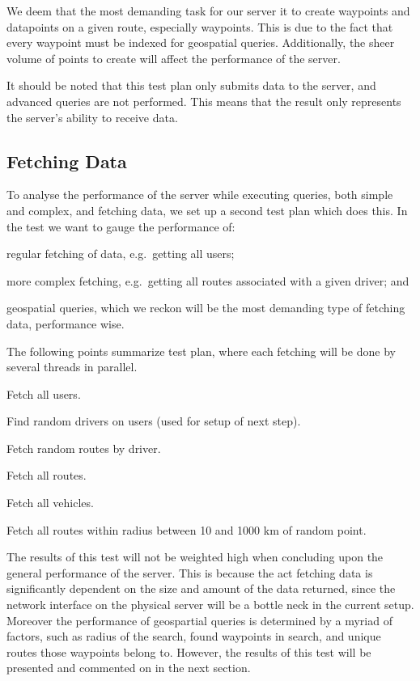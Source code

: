 We deem that the most demanding task for our server it to create waypoints and datapoints on a given route, especially waypoints.
This is due to the fact that every waypoint must be indexed for geospatial queries.
Additionally, the sheer volume of points to create will affect the performance of the server.

It should be noted that this test plan only submits data to the server, and advanced queries are not performed.
This means that the result only represents the server's ability to receive data.

\subsection{Fetching Data}
To analyse the performance of the server while executing queries, both simple and complex, and fetching data, we set up a second test plan which does this.
In the test we want to gauge the performance of:
\begin{enumberate*}
    \item regular fetching of data, e.g.~getting all users;
    \item more complex fetching, e.g.~getting all routes associated with a given driver; and
    \item geospatial queries, which we reckon will be the most demanding type of fetching data, performance wise.
\end{enumberate*}

The following points summarize test plan, where each fetching will be done by several threads in parallel.
\begin{enumberate}
    \item Fetch all users.
    \item Find random drivers on users (used for setup of next step).
    \item Fetch random routes by driver.
    \item Fetch all routes.
    \item Fetch all vehicles.
    \item Fetch all routes within radius between 10 and 1000 km of random point.
\end{enumberate}

The results of this test will not be weighted high when concluding upon the general performance of the server.
This is because the act fetching data is significantly dependent on the size and amount of the data returned, since the network interface on the physical server will be a bottle neck in the current setup.
Moreover the performance of geospartial queries is determined by a myriad of factors, such as radius of the search, found waypoints in search, and unique routes those waypoints belong to.
However, the results of this test will be presented and commented on in the next section.
